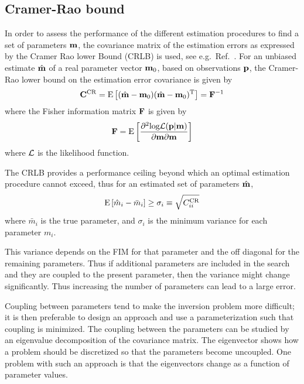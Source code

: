 \documentclass{saclantc}
\begin{document}
\subsection{Cramer-Rao bound}
In order to assess the performance of the different estimation
procedures to find a set of parameters $\bf m$,
the covariance matrix of the estimation errors as expressed
by the Cramer Rao lower Bound (CRLB) is used, see e.g.\ 
Ref.\ \cite{ottersten, baggeroer:asa89}.
For an unbiased estimate $\hat{\bf m}$ of a real parameter vector
${\bf m}_0$, based on observations ${\bf p}$, the Cramer-Rao lower bound
on the estimation error covariance is given by 
\begin{equation}
{\bf C}^{\rm CR}=
{\rm E} \left[ (\hat{\bf m}-{\bf m}_0)(\hat{\bf m}-{\bf m}_0)^{\rm T}  \right]
={\bf F}^{-1}
\end{equation}
where the Fisher information matrix ${\bf F}$ is given by
\[
{\bf F}= 
{\rm E}\left[ \frac{\partial^2 \mbox{log} {\cal L}( {\bf p} |{\bf m}) }
                   {\partial {\bf m} \partial {\bf m}} \right]
\]
where $\cal L$ is the likelihood function.

The  CRLB provides a performance
ceiling beyond which an optimal estimation procedure cannot exceed,
thus for an estimated set of parameters $\hat{\bf m}$, 
\begin{equation}
{\rm E}\left[ {\hat{m}_i- \bar{m}_i} \right] \ge \sigma_i \equiv \sqrt{C_{ii}^{\rm CR}}
\end{equation}
where $\bar{m}_i$ is the true parameter, and $ \sigma_i $ is the minimum 
variance for each parameter $m_i$.

This variance depends on the FIM for that parameter and the off
diagonal for the remaining parameters. Thus if additional parameters are
included in the search and they are coupled to the present parameter,
 then the variance might
change significantly. 
Thus increasing the number of  parameters can lead to a large error.

Coupling between parameters tend to make the inversion problem more
difficult; it is then preferable to design an approach and use a
parameterization such that coupling is minimized.
The coupling between the parameters can be studied by an eigenvalue
decomposition of the covariance matrix.
The eigenvector shows how a problem should be discretized so that the
parameters become uncoupled. One problem with such an approach is
that the eigenvectors change as a function of parameter values.
\end{document}
